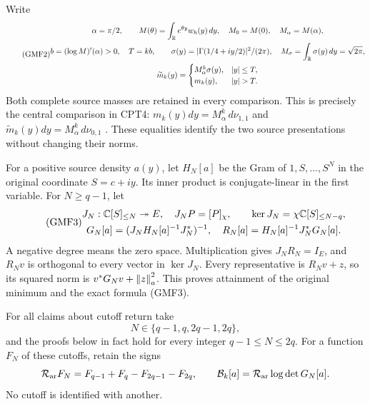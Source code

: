 \documentclass[11pt,a4paper]{article}
\begin{document}
Write
\begin{equation}\tag{GMF2}
\begin{gathered}
 \alpha=\pi/2,\qquad
 M(\theta)=\int_\R e^{\theta y}w_h(y)\,dy,\quad
 M_0=M(0),\quad M_\alpha=M(\alpha),\\
 b=(\log M)'(\alpha)>0,\quad T=kb,\qquad
 \sigma(y)=|\Gamma(1/4+iy/2)|^2/(2\pi),\quad
 M_\sigma=\int_\R\sigma(y)\,dy=\sqrt{2\pi},\\
 \widetilde m_k(y)=
 \begin{cases}M_\alpha^k\sigma(y),&|y|\le T,\\
 m_k(y),&|y|>T.\end{cases}
\end{gathered}
\end{equation}
Both complete source masses are retained in every comparison.
This is precisely the central comparison in CPT4:
\(m_k(y)dy=M_\alpha^k\,d\nu_{1,1}\) and
\(\widetilde m_k(y)dy=M_\alpha^k\,d\nu_{0,1}\)
\cite{a02gmf:cpt}.  These equalities identify the two source
presentations without changing their norms.

For a positive source density \(a(y)\), let \(H_N[a]\) be the
Gram of \(1,S,\ldots,S^N\) in the original coordinate \(S=c+iy\).
Its inner product is conjugate-linear in the first variable.
For \(N\ge q-1\), let
\begin{equation}\tag{GMF3}
\begin{gathered}
 J_N:\mathbb C[S]_{\le N}\twoheadrightarrow E,\quad
                  J_NP=[P]_\chi,\qquad
 \ker J_N=\chi\mathbb C[S]_{\le N-q},\\
 G_N[a]=(J_NH_N[a]^{-1}J_N^*)^{-1},\quad
 R_N[a]=H_N[a]^{-1}J_N^*G_N[a].
\end{gathered}
\end{equation}
A negative degree means the zero space.  Multiplication gives
\(J_NR_N=I_E\), and \(R_Nv\) is orthogonal to every vector in
\(\ker J_N\).  Every representative is \(R_Nv+z\), so its squared
norm is \(v^*G_Nv+\left\lVert z\right\rVert_a^2\).
This proves attainment of the original minimum and the exact
formula (GMF3).

For all claims about cutoff return take
\[
 N\in\{q-1,q,2q-1,2q\},
\]
and the proofs below in fact hold for every integer
\(q-1\le N\le2q\).
For a function \(F_N\) of these cutoffs, retain the signs
\[
 \mathcal R_{\rm ar}F_N=F_{q-1}+F_q-F_{2q-1}-F_{2q},\qquad
 \mathcal B_k[a]=\mathcal R_{\rm ar}\log\det G_N[a].
\]
No cutoff is identified with another.
\end{document}
